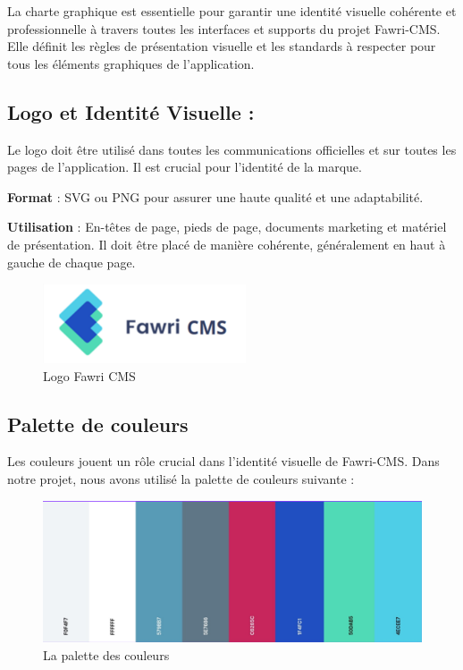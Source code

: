 \hspace{\parindent}La charte graphique est essentielle pour garantir une identité visuelle cohérente et professionnelle à travers toutes les interfaces et supports du projet Fawri-CMS. Elle définit les règles de présentation visuelle et les standards à respecter pour tous les éléments graphiques de l'application.

\subsection{Logo et Identité Visuelle :}

\hspace{\parindent}Le logo doit être utilisé dans toutes les communications officielles et sur toutes les pages de l'application. Il est crucial pour l'identité de la marque.

\textbf{Format} : SVG ou PNG pour assurer une haute qualité et une adaptabilité.

\textbf{Utilisation} : En-têtes de page, pieds de page, documents marketing et matériel de présentation. Il doit être placé de manière cohérente, généralement en haut à gauche de chaque page.
\\
\begin{figure}[H]
  \centering
  \includegraphics[width=6cm]{Figures/fawri_cms_logo.PNG}
  \caption{Logo Fawri CMS}
\end{figure}


\subsection{Palette de couleurs}
\hspace{\parindent}Les couleurs jouent un rôle crucial dans l'identité visuelle de Fawri-CMS. Dans notre projet, nous avons utilisé la palette de couleurs suivante :
\\
\begin{figure}[H]
  \centering
  \includegraphics[width=12cm]{Figures/palette.PNG}
  \caption{La palette des couleurs}
\end{figure}



